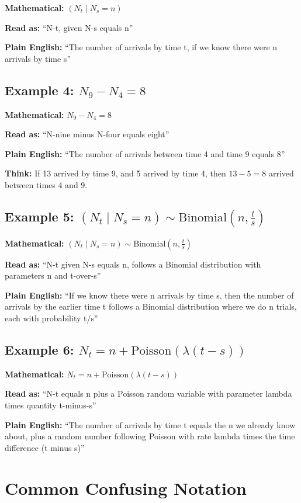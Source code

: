 \documentclass[11pt]{article}
\begin{document}
\textbf{Mathematical:} $(N_t \mid N_s = n)$

\textbf{Read as:} ``N-t, given N-s equals n''

\textbf{Plain English:} ``The number of arrivals by time t, if we know there were n arrivals by time s''

\subsection{Example 4: $N_9 - N_4 = 8$}

\textbf{Mathematical:} $N_9 - N_4 = 8$

\textbf{Read as:} ``N-nine minus N-four equals eight''

\textbf{Plain English:} ``The number of arrivals between time 4 and time 9 equals 8''

\textbf{Think:} If 13 arrived by time 9, and 5 arrived by time 4, then $13 - 5 = 8$ arrived between times 4 and 9.

\subsection{Example 5: $(N_t \mid N_s = n) \sim \text{Binomial}(n, \frac{t}{s})$}

\textbf{Mathematical:} $(N_t \mid N_s = n) \sim \text{Binomial}\left(n, \frac{t}{s}\right)$

\textbf{Read as:} ``N-t given N-s equals n, follows a Binomial distribution with parameters n and t-over-s''

\textbf{Plain English:} ``If we know there were n arrivals by time s, then the number of arrivals by the earlier time t follows a Binomial distribution where we do n trials, each with probability t/s''

\subsection{Example 6: $N_t = n + \text{Poisson}(\lambda(t-s))$}

\textbf{Mathematical:} $N_t = n + \text{Poisson}(\lambda(t-s))$

\textbf{Read as:} ``N-t equals n plus a Poisson random variable with parameter lambda times quantity t-minus-s''

\textbf{Plain English:} ``The number of arrivals by time t equals the n we already know about, plus a random number following Poisson with rate lambda times the time difference (t minus s)''

\section{Common Confusing Notation}
\end{document}
